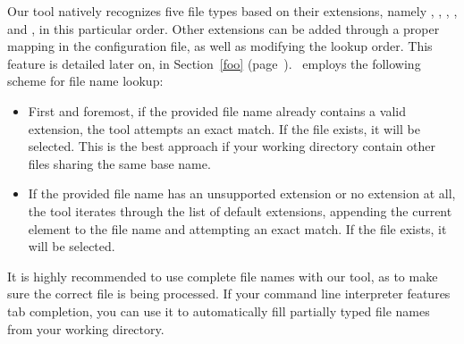 Our tool natively recognizes five file types based on their extensions, namely , , , , and , in this particular order. Other extensions can be added through a proper mapping in the configuration file, as well as modifying the lookup order. This feature is detailed later on, in Section~\ref{foo} (page~\pageref{foo}). \arara\ employs the following scheme for file name lookup:

\begin{itemize}[label={--}]
\item First and foremost, if the provided file name already contains a valid extension, the tool attempts an exact match. If the file exists, it will be selected. This is the best approach if your working directory contain other files sharing the same base name.

\item If the provided file name has an unsupported extension or no extension at all, the tool iterates through the list of default extensions, appending the current element to the file name and attempting an exact match. If the file exists, it will be selected.
\end{itemize}

It is highly recommended to use complete file names with our tool, as to make sure the correct file is being processed. If your command line interpreter features tab completion, you can use it to automatically fill partially typed file names from your working directory.